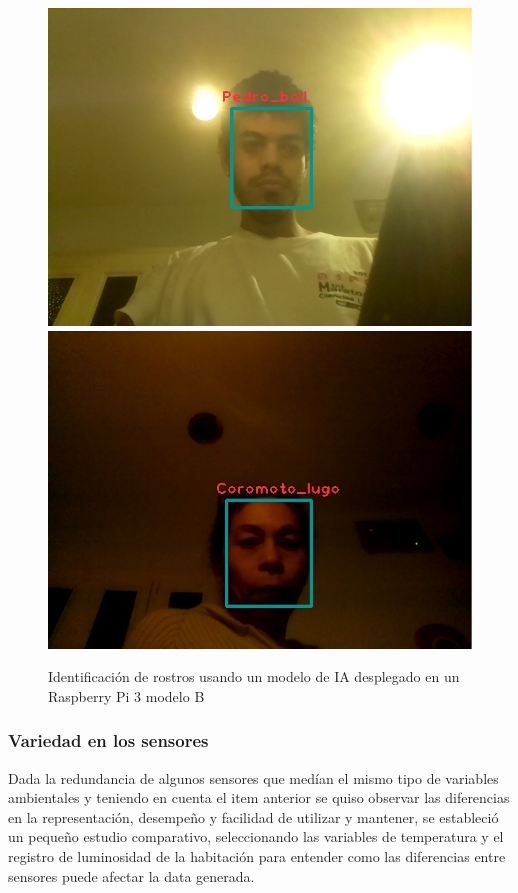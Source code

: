 \begin{itemize}
\begin{figure}[htb]
\centering
\includegraphics[scale=0.2]{./Figuras/IA_Pedro.jpeg}
\includegraphics[scale=0.2]{./Figuras/IA_Coromoto.jpeg}
\caption{Identificación de rostros usando un modelo de IA desplegado en un Raspberry Pi 3 modelo B}
\label{fig:ia_rip3}
\vspace*{-10pt}
\end{figure}

\end{itemize}

\subsubsection{Variedad en los sensores}
Dada la redundancia de algunos sensores que medían el mismo tipo de variables ambientales y teniendo en cuenta el item anterior se quiso observar las diferencias en la representación, desempeño y facilidad de utilizar y mantener, se estableció un pequeño estudio comparativo, seleccionando las variables de temperatura y el registro de luminosidad de la habitación para entender como las diferencias entre sensores puede afectar la data generada.\\ 

